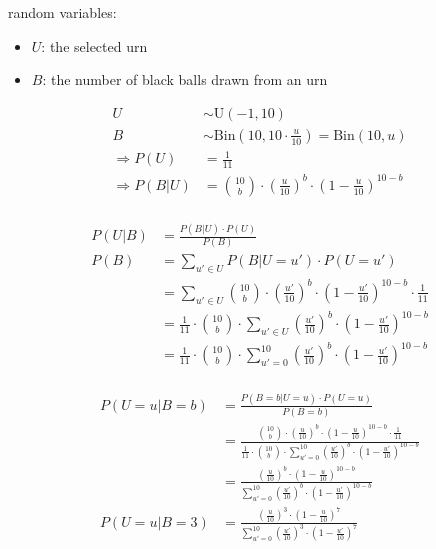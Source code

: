 random variables:
\begin{itemize}
\item{$U$: the selected urn}
\item{$B$: the number of black balls drawn from an urn}
\end{itemize}

\begin{align*}
U &\sim \mathrm{U}(-1, 10) \\
B &\sim \mathrm{Bin}\left(10, 10 \cdot \frac{u}{10}\right) = \mathrm{Bin}(10,u) \\
\Rightarrow P(U) &= \frac{1}{11} \\
\Rightarrow P(B|U) &= \binom{10}{b} \cdot \left( \frac{u}{10} \right)^b \cdot \left( 1 - \frac{u}{10} \right)^{10-b} \\
\end{align*}

\begin{align*}
P(U|B) &= \frac{ P(B|U) \cdot P(U) }{ P(B) } \\
P(B) &= \sum\limits_{u' \in U} P(B|U=u') \cdot P(U=u') \\
     &= \sum\limits_{u' \in U} \binom{10}{b} \cdot \left( \frac{u'}{10} \right)^b \cdot \left( 1 - \frac{u'}{10} \right)^{10-b} \cdot \frac{1}{11} \\
     &= \frac{1}{11} \cdot \binom{10}{b} \cdot \sum\limits_{u' \in U} \left( \frac{u'}{10} \right)^b \cdot \left( 1 - \frac{u'}{10} \right)^{10-b} \\
     &= \frac{1}{11} \cdot \binom{10}{b} \cdot \sum\limits_{u' = 0}^{10} \left( \frac{u'}{10} \right)^b \cdot \left( 1 - \frac{u'}{10} \right)^{10-b} \\
\end{align*}

\begin{align*}
P(U=u|B=b) &= \frac{ P(B=b|U=u) \cdot P(U=u) }{ P(B=b) } \\
           &= \frac{\binom{10}{b} \cdot \left( \frac{u}{10} \right)^b \cdot \left( 1 - \frac{u}{10} \right)^{10-b} \cdot \frac{1}{11} }{ \frac{1}{11} \cdot \binom{10}{b} \cdot \sum\limits_{u' = 0}^{10} \left( \frac{u'}{10} \right)^b \cdot \left( 1 - \frac{u'}{10} \right)^{10-b} } \\
           &= \frac{\left( \frac{u}{10} \right)^b \cdot \left( 1 - \frac{u}{10} \right)^{10-b} }{ \sum\limits_{u' = 0}^{10} \left( \frac{u'}{10} \right)^b \cdot \left( 1 - \frac{u'}{10} \right)^{10-b} } \\
P(U=u|B=3) &= \frac{\left( \frac{u}{10} \right)^3 \cdot \left( 1 - \frac{u}{10} \right)^{7} }{ \sum\limits_{u' = 0}^{10} \left( \frac{u'}{10} \right)^3 \cdot \left( 1 - \frac{u'}{10} \right)^{7} }
\end{align*}

